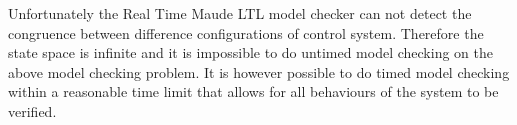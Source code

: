 Unfortunately the Real Time Maude LTL model checker can not detect the congruence between difference configurations of control system. Therefore the state space is infinite and it is impossible to do untimed model checking on the above model checking problem. It is however possible to do timed model checking within a reasonable time limit that allows for all behaviours of the system to be verified.
